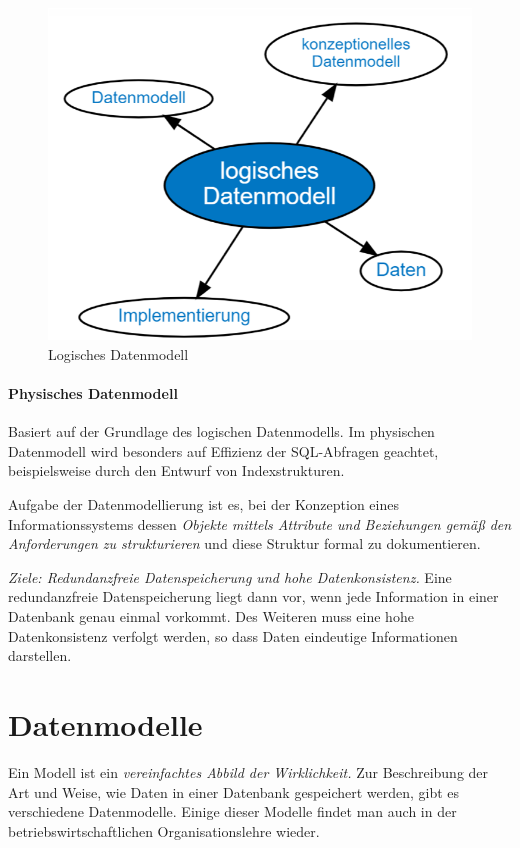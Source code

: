  \begin{figure}[H]
    \centering
    \includegraphics[width=.75\textwidth]{Content/images/modellierung/logisch.png}
    \caption{Logisches Datenmodell}
    \label{fig:modellierung:logisch}
 \end{figure}

 \paragraph{Physisches Datenmodell}
Basiert auf der Grundlage des logischen Datenmodells. Im physischen Datenmodell wird besonders auf Effizienz der SQL-Abfragen geachtet, beispielsweise durch den Entwurf von Indexstrukturen.

Aufgabe der Datenmodellierung ist es, bei der Konzeption eines Informationssystems dessen \emph{Objekte mittels Attribute und Beziehungen gemäß den Anforderungen zu strukturieren} und diese Struktur formal zu dokumentieren.

\emph{Ziele: Redundanzfreie Datenspeicherung und hohe Datenkonsistenz.}
Eine redundanzfreie Datenspeicherung liegt dann vor, wenn jede Information in einer Datenbank genau einmal vorkommt. Des Weiteren muss eine hohe Datenkonsistenz verfolgt werden, so dass Daten eindeutige Informationen darstellen.

\section{Datenmodelle}

Ein Modell ist ein \emph{vereinfachtes Abbild der Wirklichkeit.} Zur Beschreibung der Art und Weise, wie Daten in einer Datenbank gespeichert werden, gibt es verschiedene Datenmodelle. Einige dieser Modelle findet man auch in der betriebswirtschaftlichen Organisationslehre wieder.

